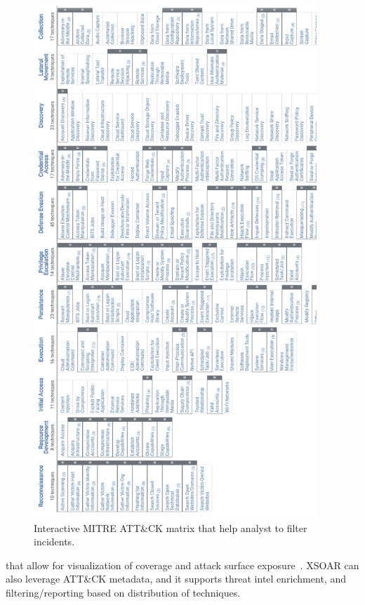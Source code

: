 \begin{figure}[H]
    \centering
    \includegraphics[width=0.95\textwidth,height=0.95\textheight]{images/mitre_att&ck_matrix.png}
    \caption[Interactive MITRE ATT\&CK matrix]{Interactive MITRE ATT\&CK matrix that help analyst to filter incidents.}
    \label{fig:mitre-attck-matrix}
\end{figure}

that allow for visualization of coverage and attack surface exposure~\cite{paloalto}. XSOAR can also leverage ATT\&CK metadata, and it supports threat intel enrichment, and filtering/reporting based on distribution of techniques. 

